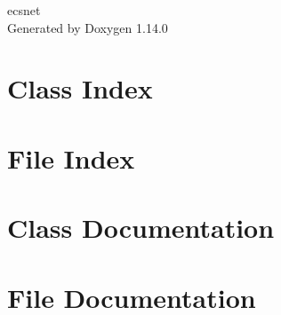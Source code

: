 \documentclass[twoside]{book}
\newcommand{\+}{\discretionary{\mbox{\scriptsize$\hookleftarrow$}}{}{}}
\newcommand{\clearemptydoublepage}{%
    \newpage{\pagestyle{empty}\cleardoublepage}%
  }
\begin{document}
  \raggedbottom
    \hypersetup{pageanchor=false,
                bookmarksnumbered=true,
                pdfencoding=unicode
               }
  \begin{titlepage}
  \vspace*{7cm}
  \begin{center}%
  {\Large ecsnet}\\
  \vspace*{1cm}
  {\large Generated by Doxygen 1.14.0}\\
  \end{center}
  \end{titlepage}
  \clearemptydoublepage
  \tableofcontents
  \clearemptydoublepage
  \hypersetup{pageanchor=true}
\chapter{Class Index}

\chapter{File Index}

\chapter{Class Documentation}





















\chapter{File Documentation}














  \backmatter
  \newpage
  \clearemptydoublepage
  \printindex
\end{document}
